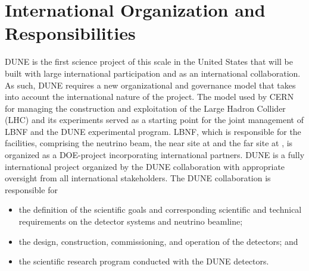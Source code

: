 \section{International Organization and Responsibilities}

DUNE is the first science project of this scale in the United States that will be built with large
international participation and as an international collaboration. As such, DUNE requires a new organizational and governance model that takes into account the international nature of the project.
The
model used by CERN for managing the construction and exploitation of the Large Hadron Collider (LHC) and its experiments served as a starting point for the joint management of LBNF and the DUNE experimental program. 
LBNF, which is responsible for the facilities, comprising the neutrino beam, the near site at \fnal and the far site at \surf, is organized as a
DOE-\fnal project incorporating international partners. 
DUNE is a fully international project
organized by the DUNE collaboration with appropriate oversight from all international stakeholders.
The DUNE collaboration is responsible for
\begin{itemize}
\item the definition of the scientific goals and corresponding scientific and technical requirements on the detector systems and neutrino beamline;
\item the design, construction, commissioning, and operation of the detectors; and
\item the scientific research program conducted with the DUNE detectors. 
\end{itemize}

